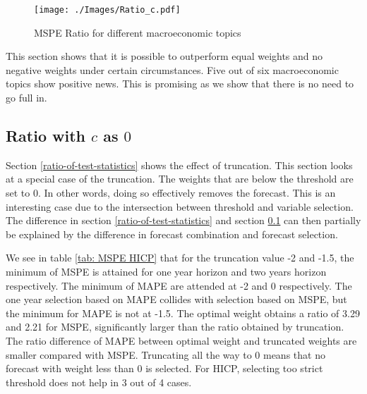 \documentclass[11pt]{article}
\begin{document}
\begin{figure}[!h]
	\centering
	\texttt{[image: ./Images/Ratio\_c.pdf]}
	\caption{MSPE Ratio for different macroeconomic topics}\label{fig: c Ratio sub}
\end{figure}

This section shows that it is possible to outperform equal weights and no negative weights under certain circumstances. Five out of six macroeconomic topics show positive news. This is promising as we show that there is no need to go full in.

\subsection{Ratio with $c$ as $0$}\label{ratio-of-mean-squared-prediction-error}
Section \ref{ratio-of-test-statistics} shows the effect of truncation. This section looks at a special case of the truncation. The weights that are below the threshold are set to $0$. In other words, doing so effectively removes the forecast. This is an interesting case due to the intersection between threshold and variable selection. The difference in section \ref{ratio-of-test-statistics} and section \ref{ratio-of-mean-squared-prediction-error} can then partially be explained by the difference in forecast combination and forecast selection.

We see in table \ref{tab: MSPE HICP} that for the truncation value -2 and -1.5, the minimum of MSPE is attained for one year horizon and two years horizon respectively. The minimum of MAPE are attended at -2 and 0 respectively. The one year selection based on MAPE collides with selection based on MSPE, but the minimum for MAPE is not at -1.5. The optimal weight obtains a ratio of 3.29 and 2.21 for MSPE, significantly larger than the ratio obtained by truncation. The ratio difference of MAPE between optimal weight and truncated weights are smaller compared with MSPE. Truncating all the way to 0 means that no forecast with weight less than 0 is selected. For HICP, selecting too strict threshold does not help in 3 out of 4 cases.
\end{document}

